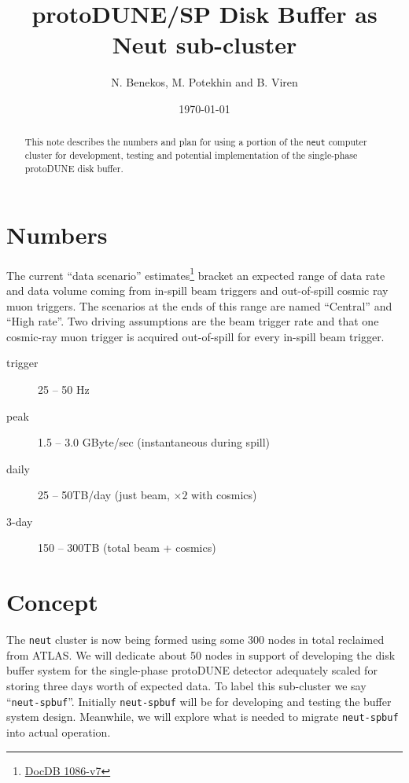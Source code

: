 \documentclass[pdftex,12pt,letter]{article}
\title{protoDUNE/SP Disk Buffer as Neut sub-cluster}
\date{\today}
\author{N. Benekos, M. Potekhin and B. Viren}
\begin{document}
\maketitle

\begin{abstract}
  This note describes the numbers and plan for using a portion of the
  \texttt{neut} computer cluster for development, testing and potential
  implementation of the single-phase protoDUNE disk buffer.  
\end{abstract}

\section{Numbers}

The current ``data scenario''
estimates\footnote{\href{http://docs.dunescience.org:8080/cgi-bin/ShowDocument?docid=1086}{DocDB
    1086-v7}} bracket an expected range of data rate and data volume
coming from in-spill beam triggers and out-of-spill cosmic ray muon triggers.
The scenarios at the ends of this range are named ``Central'' and ``High rate''.
Two driving assumptions are the beam trigger rate and that one
cosmic-ray muon trigger is acquired out-of-spill for every in-spill
beam trigger.  

\begin{description}
\item[trigger] 25 -- 50 Hz
\item[peak] 1.5 -- 3.0 GByte/sec (instantaneous during spill)
\item[daily] 25 -- 50TB/day (just beam, $\times 2$ with cosmics)
\item[3-day] 150 -- 300TB (total beam + cosmics)
\end{description}

\section{Concept}

The \texttt{neut} cluster is now being formed using some 300 nodes in
total reclaimed from ATLAS.  We will dedicate about 50 nodes in
support of developing the disk buffer system for the single-phase
protoDUNE detector adequately scaled for storing three days worth of
expected data.  To label this sub-cluster we say
``\texttt{neut-spbuf}''.  Initially \texttt{neut-spbuf} will be for
developing and testing the buffer system design.  Meanwhile, we will
explore what is needed to migrate \texttt{neut-spbuf} into actual
operation.
\end{document}
